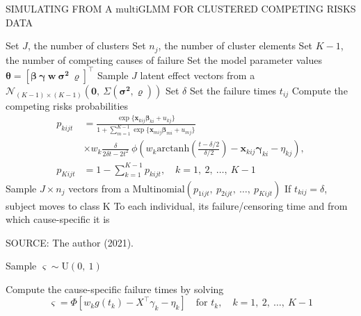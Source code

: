 \begin{algorithm}[H]
 \caption{SIMULATING FROM A \(\text{multiGLMM}\) FOR CLUSTERED COMPETING
          RISKS DATA}
 \label{alg:algo}
 \begin{algorithmic}[1]
  \State
   Set \(J\), the number of clusters
  \State
   Set \(n_{j}\), the number of cluster elements
  \State
   Set \(K-1\), the number of competing causes of failure
  \State
   Set the model parameter values \(\bm{\theta} =
   [\bm{\beta}~\bm{\gamma}~\bm{w}~\bm{\sigma^{2}}~\bm{\varrho}]^{\top}\)
  \State
   Sample \(J\) latent effect vectors from a
   \(\mathcal{N}_{(K-1)\times(K-1)}(\bm{0},~\Sigma(\bm{\sigma^{2}},
     \bm{\varrho}))\)
  \State
   Set \(\delta\)
  \State
   Set the failure times \(t_{ij}\)
  \State
   Compute the competing risks probabilities
   \begin{align*}
      p_{kijt}
      &= \frac{\exp\{\bm{x}_{kij}\bm{\beta}_{ki} + u_{kj}\}}{
        1 +
        \sum_{m=1}^{K-1}\exp\{\bm{x}_{mij}\bm{\beta}_{mi} + u_{mj}\}}\\
      &\times
        w_{k}\frac{\delta}{2\delta t - 2t^{2}}~
        \phi\left(
        w_{k}
        \text{arctanh}\left(\frac{t-\delta/2}{\delta/2}\right)
        - \bm{x}_{kij}\bm{\gamma}_{ki} - \eta_{kj}
        \right),\\
      p_{Kijt}
      &= 1 - \sum_{k = 1}^{K - 1} p_{kijt}, \quad k = 1,~2,~\dots,~K -1
    \end{align*}
    \State
    Sample \(J\times n_{j}\) vectors from a
    \(\text{Multinomial}(p_{1ijt},~p_{2ijt},~\dots,~p_{Kijt})\)
    \State
    If \(t_{kij} = \delta\), subject moves to class K
    \State
    \Return
    To each individual, its failure/censoring time and from which
    cause-specific it is
  \end{algorithmic}
\end{algorithm}
\vspace{-1cm}
\begin{footnotesize}
  \begin{center}
    SOURCE: The author (2021).
  \end{center}
\end{footnotesize}

Sample \(\varsigma\sim\text{U}(0,~1)\)

Compute the cause-specific failure times by solving
\[
 \varsigma = \Phi[w_{k} g(t_{k}) - X^{\top}\gamma_{k} - \eta_{k}]
 \quad\text{for } t_{k}, \quad k = 1,~2,~\dots,~K - 1
\]


